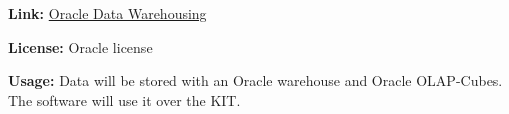 \textbf{Link:} \href{http://www.oracle.com/de/technologies/datawarehousing/index.html}{Oracle Data Warehousing}

\textbf{License:} Oracle license

\textbf{Usage:} 
Data will be stored with an Oracle warehouse and Oracle OLAP-Cubes. The software will use it over the KIT.


% 
% 
% 


